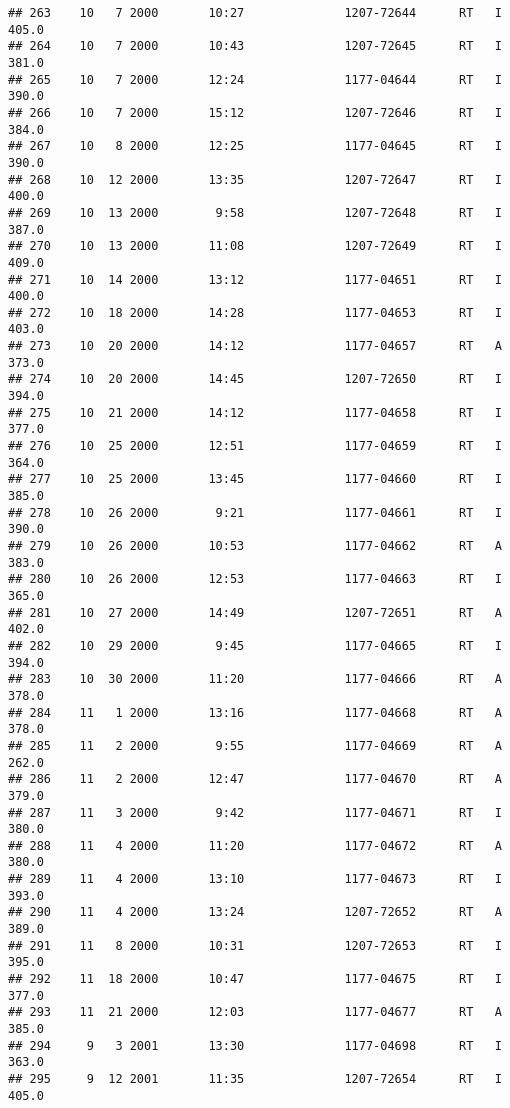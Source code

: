 \documentclass[
]{article}
\begin{document}
\begin{verbatim}
## 263    10   7 2000       10:27              1207-72644      RT   I     405.0
## 264    10   7 2000       10:43              1207-72645      RT   I     381.0
## 265    10   7 2000       12:24              1177-04644      RT   I     390.0
## 266    10   7 2000       15:12              1207-72646      RT   I     384.0
## 267    10   8 2000       12:25              1177-04645      RT   I     390.0
## 268    10  12 2000       13:35              1207-72647      RT   I     400.0
## 269    10  13 2000        9:58              1207-72648      RT   I     387.0
## 270    10  13 2000       11:08              1207-72649      RT   I     409.0
## 271    10  14 2000       13:12              1177-04651      RT   I     400.0
## 272    10  18 2000       14:28              1177-04653      RT   I     403.0
## 273    10  20 2000       14:12              1177-04657      RT   A     373.0
## 274    10  20 2000       14:45              1207-72650      RT   I     394.0
## 275    10  21 2000       14:12              1177-04658      RT   I     377.0
## 276    10  25 2000       12:51              1177-04659      RT   I     364.0
## 277    10  25 2000       13:45              1177-04660      RT   I     385.0
## 278    10  26 2000        9:21              1177-04661      RT   I     390.0
## 279    10  26 2000       10:53              1177-04662      RT   A     383.0
## 280    10  26 2000       12:53              1177-04663      RT   I     365.0
## 281    10  27 2000       14:49              1207-72651      RT   A     402.0
## 282    10  29 2000        9:45              1177-04665      RT   I     394.0
## 283    10  30 2000       11:20              1177-04666      RT   A     378.0
## 284    11   1 2000       13:16              1177-04668      RT   A     378.0
## 285    11   2 2000        9:55              1177-04669      RT   A     262.0
## 286    11   2 2000       12:47              1177-04670      RT   A     379.0
## 287    11   3 2000        9:42              1177-04671      RT   I     380.0
## 288    11   4 2000       11:20              1177-04672      RT   A     380.0
## 289    11   4 2000       13:10              1177-04673      RT   I     393.0
## 290    11   4 2000       13:24              1207-72652      RT   A     389.0
## 291    11   8 2000       10:31              1207-72653      RT   I     395.0
## 292    11  18 2000       10:47              1177-04675      RT   I     377.0
## 293    11  21 2000       12:03              1177-04677      RT   A     385.0
## 294     9   3 2001       13:30              1177-04698      RT   I     363.0
## 295     9  12 2001       11:35              1207-72654      RT   I     405.0

\end{verbatim}
\end{document}
